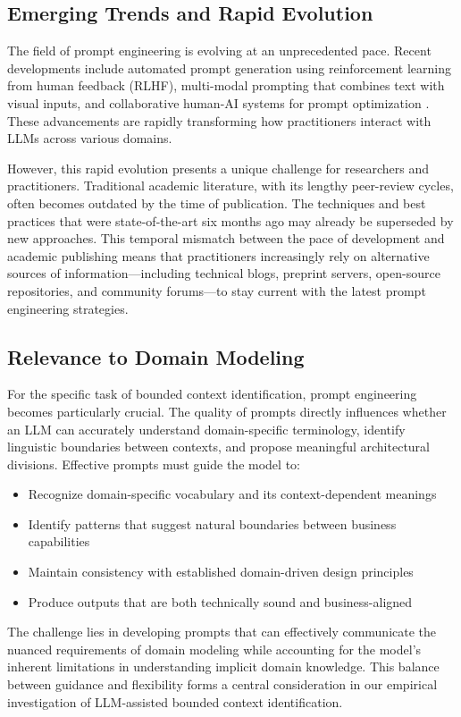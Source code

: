 \subsection{Emerging Trends and Rapid Evolution}
The field of prompt engineering is evolving at an unprecedented pace. Recent developments include automated prompt generation using reinforcement learning from human feedback (RLHF), multi-modal prompting that combines text with visual inputs, and collaborative human-AI systems for prompt optimization \autocite[]{promptAqsa}. These advancements are rapidly transforming how practitioners interact with LLMs across various domains.

However, this rapid evolution presents a unique challenge for researchers and practitioners. Traditional academic literature, with its lengthy peer-review cycles, often becomes outdated by the time of publication. The techniques and best practices that were state-of-the-art six months ago may already be superseded by new approaches. This temporal mismatch between the pace of development and academic publishing means that practitioners increasingly rely on alternative sources of information—including technical blogs, preprint servers, open-source repositories, and community forums—to stay current with the latest prompt engineering strategies.

\subsection{Relevance to Domain Modeling}
For the specific task of bounded context identification, prompt engineering becomes particularly crucial. The quality of prompts directly influences whether an LLM can accurately understand domain-specific terminology, identify linguistic boundaries between contexts, and propose meaningful architectural divisions. Effective prompts must guide the model to:

\begin{itemize}
    \item Recognize domain-specific vocabulary and its context-dependent meanings
    \item Identify patterns that suggest natural boundaries between business capabilities
    \item Maintain consistency with established domain-driven design principles
    \item Produce outputs that are both technically sound and business-aligned
\end{itemize}

The challenge lies in developing prompts that can effectively communicate the nuanced requirements of domain modeling while accounting for the model's inherent limitations in understanding implicit domain knowledge. This balance between guidance and flexibility forms a central consideration in our empirical investigation of LLM-assisted bounded context identification.
